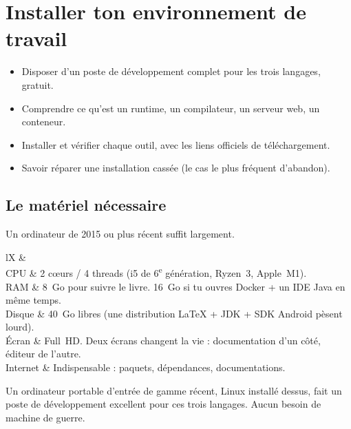 \chapter{Installer ton environnement de travail}
\label{ch-environnement}

\begin{objectif}
\begin{itemize}
  \item Disposer d'un poste de d\'eveloppement complet pour les trois langages, gratuit.
  \item Comprendre ce qu'est un runtime, un compilateur, un serveur web, un conteneur.
  \item Installer et v\'erifier chaque outil, avec les liens officiels de t\'el\'echargement.
  \item Savoir r\'eparer une installation cass\'ee (le cas le plus fr\'equent d'abandon).
\end{itemize}
\end{objectif}

\section{Le mat\'eriel n\'ecessaire}

Un ordinateur de 2015 ou plus r\'ecent suffit largement.

\begin{tabz}{lX}
  \headrow {} \&  \\
  \midrule
  CPU \& 2 c\oe{}urs / 4 threads (i5 de 6\textsuperscript{e} g\'en\'eration, Ryzen~3, Apple~M1).\\
  RAM \& 8~Go pour suivre le livre. 16~Go si tu ouvres Docker + un IDE Java en m\^eme temps.\\
  Disque \& 40~Go libres (une distribution \LaTeX{} + JDK + SDK Android p\`esent lourd).\\
  \'Ecran \& Full~HD. Deux \'ecrans changent la vie : documentation d'un c\^ot\'e, \'editeur de l'autre.\\
  Internet \& Indispensable : paquets, d\'ependances, documentations.\\
\end{tabz}

Un ordinateur portable d'entr\'ee de gamme r\'ecent, Linux install\'e dessus, fait un poste de
d\'eveloppement excellent pour ces trois langages. Aucun besoin de machine de guerre.

